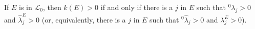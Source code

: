 If $E$ is in $\mathcal{L}_0$, then $k(E) > 0$ if and only if there is a $j$ in $E$ such that $^0\lambda_j > 0$ and $\hat{\lambda}_j^E > 0$ (or, equivalently, there is a $j$ in $E$ such that $^0\hat{\lambda}_j > 0$ and $\lambda_j^E > 0$).
